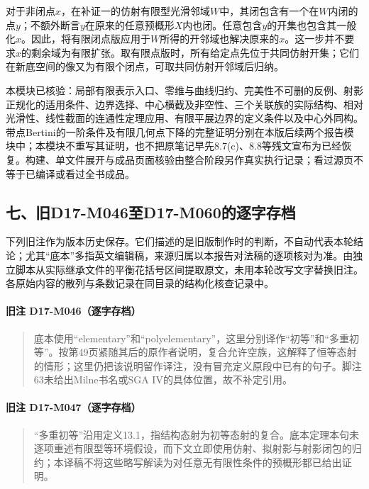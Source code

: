 \documentclass[UTF8,a4paper]{ctexbook}
\begin{document}
对于非闭点$x$，在补证一的仿射有限型光滑邻域$W$中，其闭包含有一个在$W$内闭的点$y$；不额外断言$y$在原来的任意预概形$X$内也闭。任意包含$y$的开集也包含其一般化$x$。因此，将有限闭点版应用于$W$所得的开邻域也解决原来的$x$。这一步并不要求$x$的剩余域为有限扩张。取有限点版时，所有给定点先位于共同仿射开集；它们在新底空间的像又为有限个闭点，可取共同仿射开邻域后归纳。

本模块已核验：局部有限表示入口、零维与曲线归约、完美性不可删的反例、射影正规化的适用条件、边界选择、中心横截及非空性、三个关联族的实际结构、相对光滑性、线性截面的连通性定理应用、有限平展边界的定义条件以及中心外同构。带点Bertini的一阶条件及有限几何点下降的完整证明分别在本版后续两个报告模块中；本模块不重写其证明，也不把原笔记早先8.7(c)、8.8等残文宣布为已经恢复。构建、单文件展开与成品页面核验由整合阶段另作真实执行记录；看过源页不等于已编译或看过全书成品。

\subsection*{七、旧D17-M046至D17-M060的逐字存档}

下列旧注作为版本历史保存。它们描述的是旧版制作时的判断，不自动代表本轮结论；尤其“底本”多指英文编辑稿，来源归属以本报告对法稿的逐项核对为准。由独立脚本从实际继承文件的平衡花括号区间提取原文，未用本轮改写文字替换旧注。各原始内容的散列与条数记录在同目录的结构化核查记录中。

\paragraph*{旧注 D17-M046（逐字存档）}
\begin{quote}
底本使用“elementary”和“polyelementary”，这里分别译作“初等”和“多重初等”。按第49页紧随其后的原作者说明，复合允许空族，这解释了恒等态射的情形；这里仍把该说明留作译注，没有冒充定义原段中已有的句子。脚注63未给出Milne书名或SGA IV的具体位置，故不补定引用。
\end{quote}

\paragraph*{旧注 D17-M047（逐字存档）}
\begin{quote}
“多重初等”沿用定义13.1，指结构态射为初等态射的复合。底本定理本句未逐项重述有限型等环境假设，而下文立即使用仿射、拟射影与射影闭包的归约；本译稿不将这些略写解读为对任意无有限性条件的预概形都已给出证明。
\end{quote}
\end{document}
